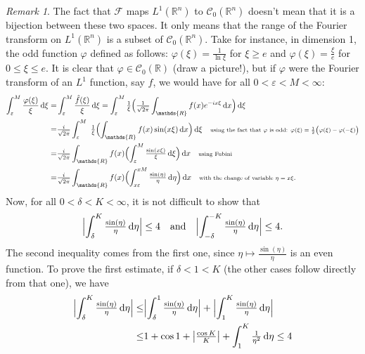 \documentclass[a4paper, 12pt]{article}
\theoremstyle{plain}
\theoremstyle{definition}
\theoremstyle{remark}
\newtheorem{remark}[proposition]{Remark}
\numberwithin{equation}{section}
\begin{document}
\begin{remark}
The fact that ${\mathscr{F}}$ maps $L^1({\mathds{R}}^n)$ to ${\mathscr{C}}_0({\mathds{R}}^n)$ doesn't mean that it is a bijection
between these two spaces. It only means that the range of the Fourier transform on $L^1({\mathds{R}}^n)$ is a subset of
${\mathscr{C}}_0({\mathds{R}}^n)$. Take for instance, in dimension 1, the odd function $\varphi$ defined as follows:
$\varphi(\xi)=\frac{1}{\ln \xi}$ for $\xi\ge e$ and $\varphi(\xi)=\frac{\xi}{e}$ for $0\le \xi\le e$. It is clear that $\varphi\in {\mathscr{C}}_0({\mathds{R}})$
(draw a picture!), but if $\varphi$ were the Fourier transform of an $L^1$ function, say $f$, we would have for all $0<\varepsilon<M<\infty$:
%
\begin{align*}
\int_\varepsilon^M\frac{\varphi(\xi)}{\xi}\,{\rm d}\xi=&
\int_\varepsilon^M\frac{\hat{f}(\xi)}{\xi}\,{\rm d}\xi
= \int_\varepsilon^M \tfrac{1}{\xi} \Bigl(\tfrac{1}{\sqrt{2\pi}}\int_{\mathds{R}}f(x)e^{-ix\xi}\,{\rm d}x\Bigr)\,{\rm d}\xi\\
=&\tfrac{i}{\sqrt{2\pi}} \int_\varepsilon^M\ \tfrac{1}{\xi} \Bigl(\int_{\mathds{R}} f(x) \sin(x\xi)\,{\rm d}x \Bigr)\,{\rm d}\xi 
\quad\mbox{\scriptsize{using the fact that $\varphi$ is odd: $\varphi(\xi)=\tfrac{1}{2}\bigl(\varphi(\xi)-\varphi(-\xi)\bigr)$}}\\
=& \tfrac{i}{\sqrt{2\pi}} \int_{\mathds{R}} f(x) \Bigl(\int_{\varepsilon}^{M}\tfrac{\sin(x\xi)}{\xi}\,{\rm d}\xi \Bigr)\,{\rm d}x 
\quad\mbox{\scriptsize{using Fubini}}\\
=& \tfrac{i}{\sqrt{2\pi}} \int_{\mathds{R}} f(x) \Bigl(\int_{x\varepsilon}^{xM}\tfrac{\sin(\eta)}{\eta}\,{\rm d}\eta \Bigr)\,{\rm d}x 
\quad\mbox{\scriptsize{with the change of variable $\eta=x\xi$}}.
\end{align*}
%
Now, for all $0<\delta<K<\infty$, it is not difficult to show that 
\[
\Bigl|\int_{\delta}^{K}\tfrac{\sin(\eta)}{\eta}\,{\rm d}\eta \Bigr|\le 4 \quad \mbox{and} \quad
\Bigl|\int_{-\delta}^{-K}\tfrac{\sin(\eta)}{\eta}\,{\rm d}\eta \Bigr|\le 4.
\]
The second inequality comes from the first one, since $\eta\mapsto \frac{\sin(\eta)}{\eta}$ is an even function. To prove the first 
estimate, if $\delta<1<K$ (the other cases follow directly from that one), we have
%
\begin{align*}
\Bigl|\int_{\delta}^{K}\tfrac{\sin(\eta)}{\eta}\,{\rm d}\eta \Bigr|
\le &\Bigl|\int_{\delta}^1\tfrac{\sin(\eta)}{\eta}\,{\rm d}\eta \Bigr| +\Bigl| \int_1^K\tfrac{\sin(\eta)}{\eta}\,{\rm d}\eta \Bigr|\\
\le &1 +\cos 1 +\bigl|\tfrac{\cos K}{K}\bigr| +\int_1^K\tfrac{1}{\eta^2}\,{\rm d}\eta \le 4

\end{align*}
\end{remark}
\end{document}

